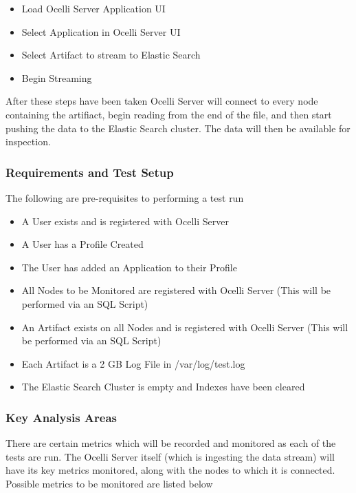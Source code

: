 \documentclass{llncs}
\begin{document}
\begin{itemize}
\item Load Ocelli Server Application UI
\item Select Application in Ocelli Server UI
\item Select Artifact to stream to Elastic Search
\item Begin Streaming
\end{itemize}

After these steps have been taken Ocelli Server will connect to every node containing the artifiact, begin reading from the end of the file, and then start pushing the data to the Elastic Search cluster. The data will then be available for inspection.

\subsubsection{Requirements and Test Setup}

The following are pre-requisites to performing a test run

\begin{itemize}
\item A User exists and is registered with Ocelli Server 
\item A User has a Profile Created
\item The User has added an Application to their Profile
\item All Nodes to be Monitored are registered with Ocelli Server (This will be performed via an SQL Script)
\item An Artifact exists on all Nodes and is registered with Ocelli Server (This will be performed via an SQL Script)
\item Each Artifact is a 2 GB Log File in /var/log/test.log
\item The Elastic Search Cluster is empty and Indexes have been cleared
 \end{itemize}

\subsubsection{Key Analysis Areas}

There are certain metrics which will be recorded and monitored as each of the tests are run. The Ocelli Server itself (which is ingesting the data stream) will have its key metrics monitored, along with the nodes to which it is connected. Possible metrics to be monitored are listed below
\end{document}
